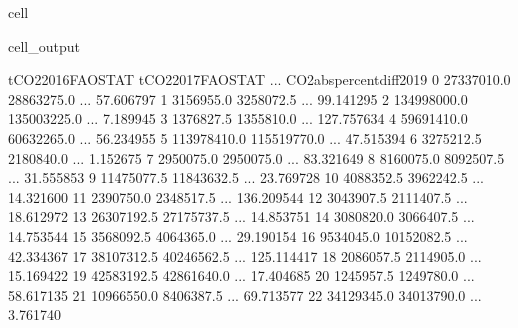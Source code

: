 \documentclass[letterpaper,10pt,english]{jupyterBook}
\begin{document}
\begin{sphinxuseclass}{cell}
\begin{sphinxVerbatimOutput}
\begin{sphinxuseclass}{cell_output}
\begin{sphinxVerbatim}[commandchars=\\\{\}]
    tCO2\PYGZus{}2016\PYGZus{}FAOSTAT  tCO2\PYGZus{}2017\PYGZus{}FAOSTAT  ...  CO2\PYGZus{}abs\PYGZus{}percent\PYGZus{}diff\PYGZus{}2019  \PYGZbs{}
0          27337010.0         28863275.0  ...                  57.606797   
1           3156955.0          3258072.5  ...                  99.141295   
2         134998000.0        135003225.0  ...                   7.189945   
3           1376827.5          1355810.0  ...                 127.757634   
4          59691410.0         60632265.0  ...                  56.234955   
5         113978410.0        115519770.0  ...                  47.515394   
6           3275212.5          2180840.0  ...                   1.152675   
7           2950075.0          2950075.0  ...                  83.321649   
8           8160075.0          8092507.5  ...                  31.555853   
9          11475077.5         11843632.5  ...                  23.769728   
10          4088352.5          3962242.5  ...                  14.321600   
11          2390750.0          2348517.5  ...                 136.209544   
12          3043907.5          2111407.5  ...                  18.612972   
13         26307192.5         27175737.5  ...                  14.853751   
14          3080820.0          3066407.5  ...                  14.753544   
15          3568092.5          4064365.0  ...                  29.190154   
16          9534045.0         10152082.5  ...                  42.334367   
17         38107312.5         40246562.5  ...                 125.114417   
18          2086057.5          2114905.0  ...                  15.169422   
19         42583192.5         42861640.0  ...                  17.404685   
20          1245957.5          1249780.0  ...                  58.617135   
21         10966550.0          8406387.5  ...                  69.713577   
22         34129345.0         34013790.0  ...                   3.761740   


\end{sphinxVerbatim}
\end{sphinxuseclass}
\end{sphinxVerbatimOutput}
\end{sphinxuseclass}
\end{document}
